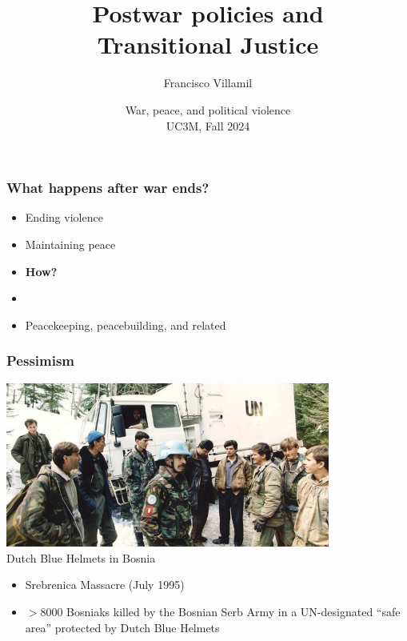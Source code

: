 \documentclass[aspectratio=43]{beamer}
\title{\huge Postwar policies and\\\vspace{5pt}Transitional Justice}
\author{Francisco Villamil}
\date{War, peace, and political violence\\UC3M, Fall 2024}
\begin{document}
\begin{frame}
  \titlepage
\end{frame}


  
\begin{frame}
\frametitle{What happens after war ends?}
\centering

\begin{itemize}
  \item Ending violence
  \item Maintaining peace
  \item \textbf{How?}
  \item[]
  \item<2-> Peacekeeping, peacebuilding, and related
\end{itemize}

\end{frame}



\begin{frame}
\frametitle{Pessimism}
\centering

\includegraphics[width = 0.8\textwidth]{img/srebrenica-dutch-peacekeepers}\\
{\small Dutch Blue Helmets in Bosnia}

\vspace{10pt}

\begin{itemize}
  \item Srebrenica Massacre (July 1995)
  \item $>$8000 Bosniaks killed by the Bosnian Serb Army in a UN-designated ``safe area'' protected by Dutch Blue Helmets
\end{itemize}

\end{frame}
\end{document}
